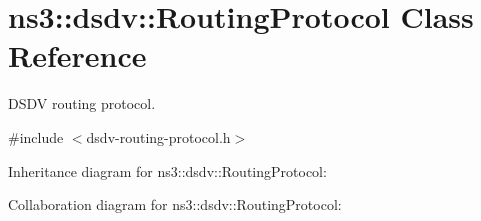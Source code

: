 \hypertarget{classns3_1_1dsdv_1_1RoutingProtocol}{}\section{ns3\+:\+:dsdv\+:\+:Routing\+Protocol Class Reference}
\label{classns3_1_1dsdv_1_1RoutingProtocol}


D\+S\+DV routing protocol.  




{\ttfamily \#include $<$dsdv-\/routing-\/protocol.\+h$>$}



Inheritance diagram for ns3\+:\+:dsdv\+:\+:Routing\+Protocol\+:


Collaboration diagram for ns3\+:\+:dsdv\+:\+:Routing\+Protocol\+:
